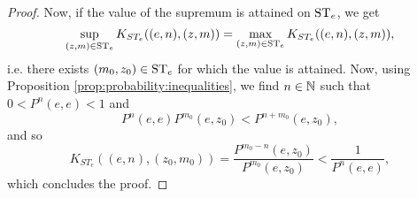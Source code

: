 \documentclass[12pt, class = article, crop = false, a4paper, twoside]{standalone}
\begin{document}
\begin{proof}
    Now, if the value of the supremum is attained on $\operatorname{ST}_{e}$, we get
    \begin{equation*}
        \sup_{(z, m)\in\operatorname{ST}_{e}}K_{ST_{e}}((e, n), (z, m)) = \max_{(z, m)\in\operatorname{ST}_{e}}K_{ST_{e}}((e, n), (z, m)),
    \end{equation*}
    i.e. there exists $(m_{0}, z_{0})\in\operatorname{ST}_{e}$ for which the value is attained. Now, using Proposition \ref{prop:probability:inequalities}, we find $n\in\mathbb{N}$ such that $0 < P^{n}(e, e) < 1$ and
    \begin{equation*}
        P^{n}(e, e)P^{m_{0}}(e, z_{0}) < P^{n + m_{0}}(e, z_{0}),
    \end{equation*}
    and so 
    \begin{equation*}
        K_{ST_{e}}((e, n), (z_{0}, m_{0})) = \dfrac{P^{m_{0} - n}(e, z_{0})}{P^{m_{0}}(e, z_{0})} < \dfrac{1}{P^{n}(e, e)},
    \end{equation*}
    which concludes the proof.
\end{proof}
\end{document}
